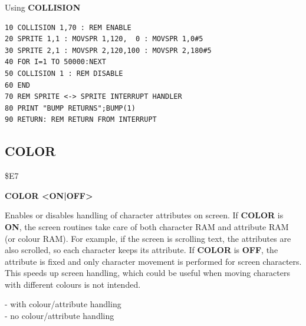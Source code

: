 \begin{description}[leftmargin=2cm,style=nextline]
\item [Example:] Using {\bf COLLISION}
\begin{tcolorbox}[colback=black,coltext=white]
\verbatimfont{\codefont}
\begin{verbatim}
10 COLLISION 1,70 : REM ENABLE
20 SPRITE 1,1 : MOVSPR 1,120,  0 : MOVSPR 1,0#5
30 SPRITE 2,1 : MOVSPR 2,120,100 : MOVSPR 2,180#5
40 FOR I=1 TO 50000:NEXT
50 COLLISION 1 : REM DISABLE
60 END
70 REM SPRITE <-> SPRITE INTERRUPT HANDLER
80 PRINT "BUMP RETURNS";BUMP(1)
90 RETURN: REM RETURN FROM INTERRUPT
\end{verbatim}
\end{tcolorbox}
\end{description}


\newpage
\subsection{COLOR}
\begin{description}[leftmargin=2cm,style=nextline]
\item [Token:] \$E7
\item [Format:] {\bf COLOR <ON|OFF>}
\item [Usage:] Enables or disables
               handling of character attributes on screen.
               If {\bf COLOR} is {\bf ON}, the screen routines
               take care of both character RAM and attribute RAM (or colour RAM).
               For example, if the screen is scrolling text, the attributes
               are also scrolled, so each character keeps its attribute.
               If {\bf COLOR} is {\bf OFF}, the attribute
               is fixed and only character movement is performed
               for screen characters. This speeds up screen
               handling, which could be useful when moving characters with different colours is
               not intended.
\item [Example:]  - with colour/attribute handling \\
                  - no colour/attribute handling

\end{description}


\newpage
